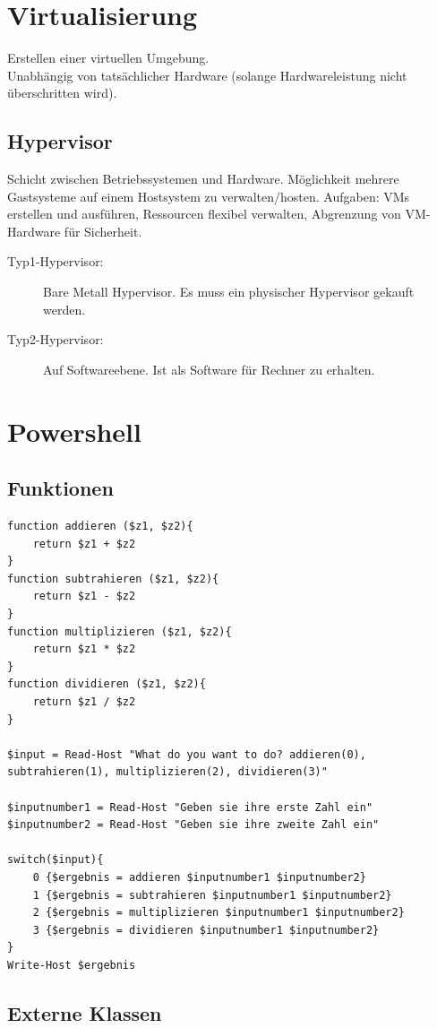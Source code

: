 \documentclass[12pt,a4paper]{article}
\begin{document}
\section{Virtualisierung}
	Erstellen einer virtuellen Umgebung.\\
	Unabhängig von tatsächlicher Hardware (solange Hardwareleistung nicht überschritten wird).\\
	
	\subsection{Hypervisor}
		Schicht zwischen Betriebssystemen und Hardware.
		Möglichkeit mehrere Gastsysteme auf einem Hostsystem zu verwalten/hosten.
		Aufgaben: VMs erstellen und ausführen, Ressourcen flexibel verwalten, Abgrenzung von VM-Hardware für Sicherheit.\\
		\begin{description}
			\item[Typ1-Hypervisor:] Bare Metall Hypervisor. Es muss ein physischer Hypervisor gekauft werden.
			\item[Typ2-Hypervisor:] Auf Softwareebene. Ist als Software für Rechner zu erhalten.
		\end{description}
		
\section{Powershell}
	\subsection*{Funktionen}
		\begin{lstlisting}
function addieren ($z1, $z2){
    return $z1 + $z2
}
function subtrahieren ($z1, $z2){
    return $z1 - $z2
}
function multiplizieren ($z1, $z2){
    return $z1 * $z2
}
function dividieren ($z1, $z2){
    return $z1 / $z2
}

$input = Read-Host "What do you want to do? addieren(0), subtrahieren(1), multiplizieren(2), dividieren(3)"

$inputnumber1 = Read-Host "Geben sie ihre erste Zahl ein"
$inputnumber2 = Read-Host "Geben sie ihre zweite Zahl ein"

switch($input){
    0 {$ergebnis = addieren $inputnumber1 $inputnumber2}
    1 {$ergebnis = subtrahieren $inputnumber1 $inputnumber2}
    2 {$ergebnis = multiplizieren $inputnumber1 $inputnumber2}
    3 {$ergebnis = dividieren $inputnumber1 $inputnumber2}
}
Write-Host $ergebnis 
		\end{lstlisting}

	\subsection*{Externe Klassen}
\end{document}
